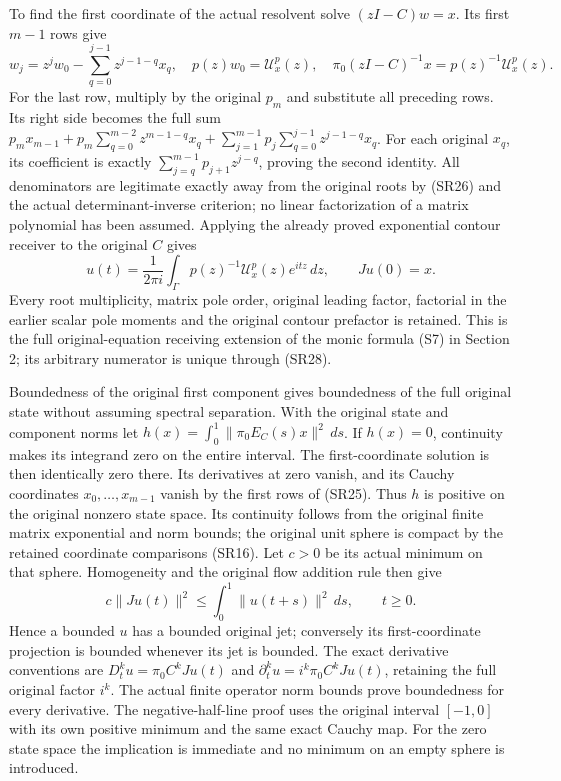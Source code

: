 \documentclass[
  11pt,
]{article}
\begin{document}
To find the first coordinate of the actual resolvent solve
\((zI-C)w=x\). Its first \(m-1\) rows give \[
 w_j=z^jw_0-\sum_{q=0}^{j-1}z^{j-1-q}x_q,\quad
 p(z)w_0=\mathcal U_x^p(z),\quad
 \pi_0(zI-C)^{-1}x=p(z)^{-1}\mathcal U_x^p(z).                \tag{SR29}
\] For the last row, multiply by the original \(p_m\) and substitute all
preceding rows. Its right side becomes the full sum
\(p_mx_{m-1}+p_m\sum_{q=0}^{m-2}z^{m-1-q}x_q+
  \sum_{j=1}^{m-1}p_j\sum_{q=0}^{j-1}z^{j-1-q}x_q\). For each original
\(x_q\), its coefficient is exactly \(\sum_{j=q}^{m-1}p_{j+1}z^{j-q}\),
proving the second identity. All denominators are legitimate exactly
away from the original roots by (SR26) and the actual
determinant-inverse criterion; no linear factorization of a matrix
polynomial has been assumed. Applying the already proved exponential
contour receiver to the original \(C\) gives \[
 u(t)=\frac{1}{2\pi i}\int_\Gamma
                   p(z)^{-1}\mathcal U_x^p(z)e^{itz}\,dz,
                  \qquad Ju(0)=x.                            \tag{SR30}
\] Every root multiplicity, matrix pole order, original leading factor,
factorial in the earlier scalar pole moments and the original contour
prefactor is retained. This is the full original-equation receiving
extension of the monic formula (S7) in Section 2; its arbitrary
numerator is unique through (SR28).

Boundedness of the original first component gives boundedness of the
full original state without assuming spectral separation. With the
original state and component norms let
\(h(x)=\int_0^1\|\pi_0E_C(s)x\|^2\,ds\). If \(h(x)=0\), continuity makes
its integrand zero on the entire interval. The first-coordinate solution
is then identically zero there. Its derivatives at zero vanish, and its
Cauchy coordinates \(x_0,\ldots,x_{m-1}\) vanish by the first rows of
(SR25). Thus \(h\) is positive on the original nonzero state space. Its
continuity follows from the original finite matrix exponential and norm
bounds; the original unit sphere is compact by the retained coordinate
comparisons (SR16). Let \(c>0\) be its actual minimum on that sphere.
Homogeneity and the original flow addition rule then give \[
 c\|Ju(t)\|^2\leq
        \int_0^1\|u(t+s)\|^2\,ds,\qquad t\geq0.              \tag{SR31}
\] Hence a bounded \(u\) has a bounded original jet; conversely its
first-coordinate projection is bounded whenever its jet is bounded. The
exact derivative conventions are \(D_t^ku=\pi_0C^kJu(t)\) and
\(\partial_t^ku=i^k\pi_0C^kJu(t)\), retaining the full original factor
\(i^k\). The actual finite operator norm bounds prove boundedness for
every derivative. The negative-half-line proof uses the original
interval \([-1,0]\) with its own positive minimum and the same exact
Cauchy map. For the zero state space the implication is immediate and no
minimum on an empty sphere is introduced.
\end{document}
